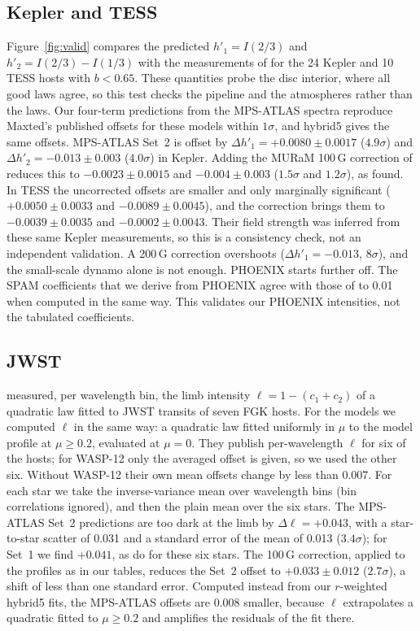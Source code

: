 \documentclass{aa}
\begin{document}
\subsection{Kepler and TESS}\label{sec:kepler}
Figure~\ref{fig:valid} compares the predicted $h'_1=I(2/3)$ and
$h'_2=I(2/3)-I(1/3)$ with the measurements of \citet{maxted2023} for the 24
Kepler and 10 TESS hosts with $b<0.65$. These quantities probe the disc
interior, where all good laws agree, so this test checks the pipeline and the
atmospheres rather than the laws. Our four-term predictions from the MPS-ATLAS
spectra reproduce Maxted's published offsets for these models within
$1\sigma$, and hybrid5 gives the same offsets. MPS-ATLAS Set~2 is offset by
$\Delta h'_1=+0.0080\pm0.0017$ ($4.9\sigma$) and
$\Delta h'_2=-0.013\pm0.003$ ($4.0\sigma$) in Kepler. Adding the MURaM 100\,G
correction of \citet{kostogryz2026} reduces this to $-0.0023\pm0.0015$ and
$-0.004\pm0.003$ ($1.5\sigma$ and $1.2\sigma$), as \citet{kostogryz2024}
found. In TESS the uncorrected offsets are smaller and only marginally
significant ($+0.0050\pm0.0033$ and $-0.0089\pm0.0045$), and the correction
brings them to $-0.0039\pm0.0035$ and $-0.0002\pm0.0043$. Their field strength was inferred from these same Kepler measurements,
so this is a consistency check, not an independent validation. A 200\,G
correction overshoots ($\Delta h'_1=-0.013$, $8\sigma$), and the small-scale
dynamo alone is not enough. PHOENIX starts further off. The SPAM coefficients
\citep[quadratic coefficients fitted to a synthetic light
curve;][]{howarth2011} that we derive from PHOENIX agree with those of
\citet{patel2022} to 0.01 when computed in the same way. This validates our
PHOENIX intensities, not the tabulated coefficients.

\subsection{JWST}
\citet{sing2026} measured, per wavelength bin, the limb intensity
$\ell=1-(c_1+c_2)$ of a quadratic law fitted to JWST transits of seven FGK
hosts. For the models we computed $\ell$ in the same way: a quadratic law fitted
uniformly in $\mu$ to the model profile at $\mu\ge0.2$, evaluated at $\mu=0$.
They publish per-wavelength $\ell$ for six of the hosts; for WASP-12 only the
averaged offset is given, so we used the other six. Without WASP-12 their own
mean offsets change by less than 0.007. For each star we take the
inverse-variance mean over wavelength bins (bin correlations ignored), and
then the plain mean over the six stars. The MPS-ATLAS Set~2 predictions are
too dark at the limb by $\Delta\ell=+0.043$, with a star-to-star scatter of
0.031 and a standard error of the mean of 0.013 ($3.4\sigma$); for Set~1 we
find $+0.041$, as \citet{sing2026} do for these six stars. The 100\,G correction, applied to the
profiles as in our tables, reduces the Set~2 offset to $+0.033\pm0.012$
($2.7\sigma$), a shift of less than one standard error. Computed instead from
our $r$-weighted hybrid5 fits, the MPS-ATLAS offsets are 0.008 smaller, because
$\ell$ extrapolates a quadratic fitted to $\mu\ge0.2$ and amplifies the
residuals of the fit there.
\end{document}
